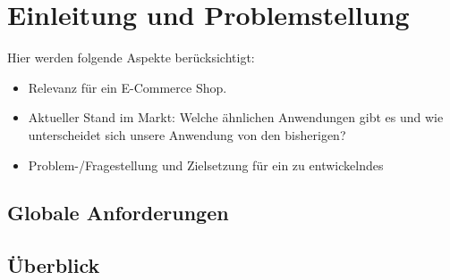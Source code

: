 \chapter{Einleitung und Problemstellung}


Hier werden folgende Aspekte berücksichtigt: 


\begin{itemize}
	\item Relevanz für ein E-Commerce Shop. 
	\item Aktueller Stand im Markt: Welche ähnlichen Anwendungen gibt es und wie unterscheidet sich unsere Anwendung von den bisherigen? 
	\item Problem-/Fragestellung und Zielsetzung für ein zu entwickelndes  
\end{itemize}

\section{Globale Anforderungen}

\section{Überblick}
